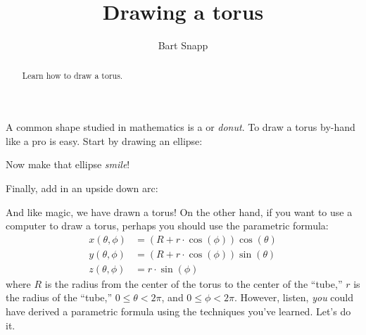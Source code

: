 \documentclass{ximera}
\author{Bart Snapp}
\title[Dig-In:]{Drawing a torus}
\begin{document}
\begin{abstract}
  Learn how to draw a torus.
\end{abstract}
\maketitle

A common shape studied in mathematics is a  or
\textit{donut}. To draw a torus by-hand like a pro is easy. Start by
drawing an ellipse:
\begin{image}
\end{image}

Now make that ellipse \textit{smile}!

\begin{image}
\end{image}

Finally, add in an upside down arc:

\begin{image}
\end{image}

And like magic, we have drawn a torus! On the other hand, if you want
to use a computer to draw a torus, perhaps you should use the
parametric formula:
\begin{align*}
  x(\theta,\phi) &= (R + r\cdot \cos(\phi))\cos(\theta)\\
  y(\theta,\phi) &= (R + r\cdot \cos(\phi))\sin(\theta)\\
  z(\theta,\phi) &= r\cdot \sin(\phi)
\end{align*}
where $R$ is the radius from the center of the torus to the center of
the ``tube,'' $r$ is the radius of the ``tube,'' $0\le \theta<2\pi$,
and $0\le \phi<2\pi$. However, listen, \textit{you} could have derived
a parametric formula using the techniques you've learned. Let's do it.
\end{document}
